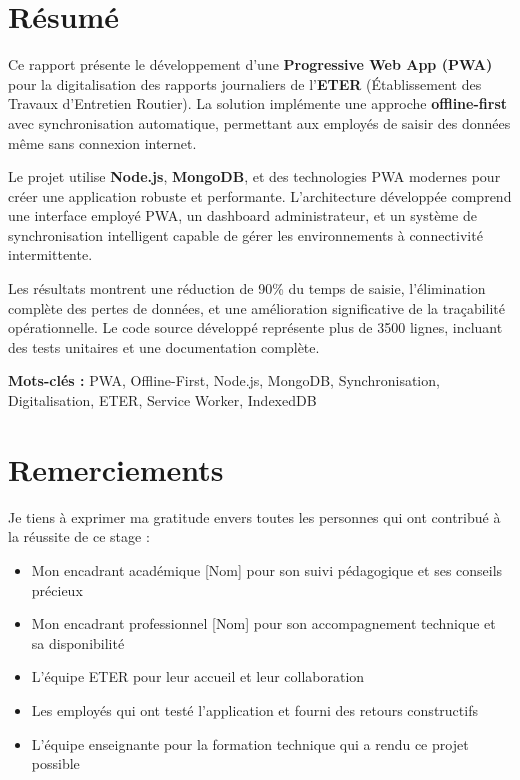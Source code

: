 \documentclass[12pt,a4paper]{report}
\newcommand{\tech}[1]{\textcolor{eterblue}{\textbf{#1}}}
\begin{document}

\chapter*{Résumé}

Ce rapport présente le développement d'une \tech{Progressive Web App (PWA)} pour la digitalisation des rapports journaliers de l'\tech{ETER} (Établissement des Travaux d'Entretien Routier). La solution implémente une approche \tech{offline-first} avec synchronisation automatique, permettant aux employés de saisir des données même sans connexion internet.

Le projet utilise \tech{Node.js}, \tech{MongoDB}, et des technologies PWA modernes pour créer une application robuste et performante. L'architecture développée comprend une interface employé PWA, un dashboard administrateur, et un système de synchronisation intelligent capable de gérer les environnements à connectivité intermittente.

Les résultats montrent une réduction de 90\% du temps de saisie, l'élimination complète des pertes de données, et une amélioration significative de la traçabilité opérationnelle. Le code source développé représente plus de 3500 lignes, incluant des tests unitaires et une documentation complète.

\textbf{Mots-clés :} PWA, Offline-First, Node.js, MongoDB, Synchronisation, Digitalisation, ETER, Service Worker, IndexedDB

\newpage

\chapter*{Remerciements}

Je tiens à exprimer ma gratitude envers toutes les personnes qui ont contribué à la réussite de ce stage :

\begin{itemize}
    \item Mon encadrant académique [Nom] pour son suivi pédagogique et ses conseils précieux
    \item Mon encadrant professionnel [Nom] pour son accompagnement technique et sa disponibilité
    \item L'équipe ETER pour leur accueil et leur collaboration
    \item Les employés qui ont testé l'application et fourni des retours constructifs
    \item L'équipe enseignante pour la formation technique qui a rendu ce projet possible
\end{itemize}
\end{document}
